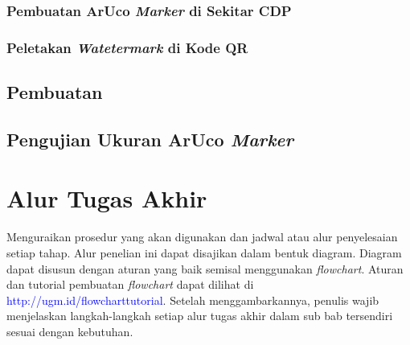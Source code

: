 \subsubsection{Pembuatan ArUco \emph{Marker} di Sekitar CDP}

\subsubsection{Peletakan \emph{Watetermark} di Kode QR}

\subsection{Pembuatan}

\subsection{Pengujian Ukuran ArUco \emph{Marker}}

\section{Alur Tugas Akhir}

Menguraikan prosedur yang akan digunakan dan jadwal atau alur penyelesaian setiap 
tahap. Alur penelian ini dapat disajikan dalam bentuk diagram. Diagram dapat disusun dengan aturan yang baik semisal menggunakan \textit{flowchart}. Aturan dan tutorial pembuatan \textit{flowchart} dapat dilihat di \textcolor{blue}{http://ugm.id/flowcharttutorial}. Setelah menggambarkannya, penulis wajib menjelaskan langkah-langkah setiap alur tugas akhir dalam sub bab tersendiri sesuai dengan kebutuhan.
